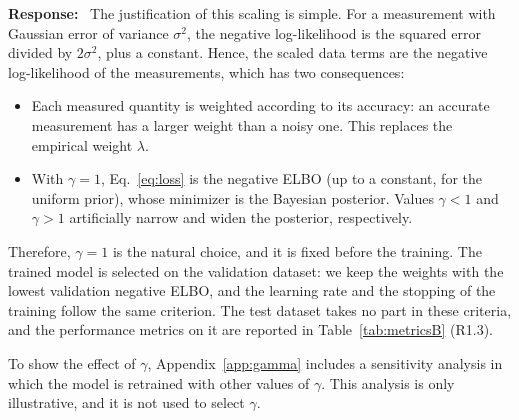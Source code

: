 \documentclass[11pt]{article}
\newenvironment{response}{\par\smallskip\noindent\color{resp}\textbf{Response:}\ }{\par}
\newcommand{\authornote}[1]{\textcolor{note}{\textsf{[Authors: #1]}}}
\begin{document}
\begin{response}
The justification of this scaling is simple.
For a measurement with Gaussian error of variance $\sigma^2$, the negative log-likelihood is the squared error divided by $2\sigma^2$, plus a constant.
Hence, the scaled data terms are the negative log-likelihood of the measurements, which has two consequences:
\begin{itemize}[leftmargin=*]
\item Each measured quantity is weighted according to its accuracy: an accurate measurement has a larger weight than a noisy one. This replaces the empirical weight $\lambda$.
\item With $\gamma=1$, Eq.~\eqref{eq:loss} is the negative ELBO (up to a constant, for the uniform prior), whose minimizer is the Bayesian posterior. Values $\gamma<1$ and $\gamma>1$ artificially narrow and widen the posterior, respectively.
\end{itemize}
Therefore, $\gamma=1$ is the natural choice, and it is fixed before the training.
The trained model is selected on the validation dataset: we keep the weights with the lowest validation negative ELBO, and the learning rate and the stopping of the training follow the same criterion.
The test dataset takes no part in these criteria, and the performance metrics on it are reported in Table~\ref{tab:metricsB} (R1.3).

To show the effect of $\gamma$, Appendix~\ref{app:gamma} includes a sensitivity analysis in which the model is retrained with other values of $\gamma$.
This analysis is only illustrative, and it is not used to select $\gamma$.
\end{response}
\end{document}
